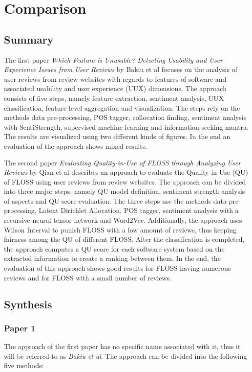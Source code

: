 \section{Comparison}
\subsection{Summary}
The first paper \textit{Which Feature is Unusable? Detecting Usability and User Experience Issues from User Reviews} by Bakiu et al focuses on the analysis of user reviews from review websites with regards to features of software and associated usability and user experience (UUX) dimensions. The approach consists of five steps, namely feature extraction, sentiment analysis, UUX classification, feature level aggregation and visualization. The steps rely on the methods data pre-processing, POS tagger, collocation finding, sentiment analysis with SentiStrength, supervised machine learning and information seeking mantra. The results are visualized using two different kinds of figures. In the end an evaluation of the approach shows mixed results.

The second paper \textit{Evaluating Quality-in-Use of FLOSS through Analyzing User Reviews} by Qian et al describes an approach to evaluate the Quality-in-Use (QU) of FLOSS using user reviews from review websites. The approach can be divided into three major steps, namely QU model definition, sentiment strength analysis of aspects and QU score evaluation. The three steps use the methods data pre-processing, Latent Dirichlet Allocation, POS tagger, sentiment analysis with a recursive neural tensor network and Word2Vec. Additionally, the approach uses Wilson Interval to punish FLOSS with a low amount of reviews, thus keeping fairness among the QU of different FLOSS. After the classification is completed, the approach computes a QU score for each software system based on the extracted information to create a ranking between them. In the end, the evaluation of this approach shows good results for FLOSS having numerous reviews and for FLOSS with a small number of reviews.

\subsection{Synthesis}
\subsubsection*{Paper 1}
The approach of the first paper has no specific name associated with it, thus it will be referred to as \textit{Bakiu et al}. The approach can be divided into the following five methods:

